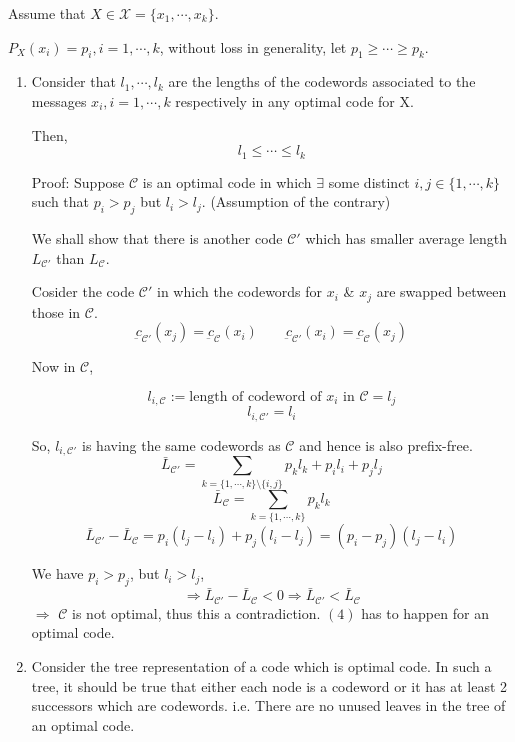 \documentclass{article}
\begin{document}
Assume that $X \in \mathcal{X}= \{ x_1, \cdots, x_k\}$.

$P_X(x_i)= p_i, i=1, \cdots , k$, without loss in generality, let $p_1 \geq \cdots \geq p_k$.
\begin{enumerate}
    \item Consider that $l_1, \cdots, l_k$ are the lengths of the codewords associated to the messages $x_i, i=1,\cdots, k$ respectively in any optimal code for X.

    Then,
    \begin{equation}
        l_1 \leq \cdots \leq l_k
    \end{equation}

    Proof: Suppose $\mathscr{C}$ is an optimal code in which $\exists $ some distinct $i,j \in \{1,\cdots, k \}$ such that $p_i > p_j$ but $l_i > l_j$. (Assumption of the contrary)

    We shall show that there is another code $\mathscr{C}'$ which has smaller average length $L_{\mathscr{C'}}$ than $L_{\mathscr{C}}$.

    Cosider the code $\mathscr{C}'$ in which the codewords for $x_i$ \& $x_j$ are swapped between those in $\mathscr{C}$.
    $$ \underbar{c}_{\mathscr{C'}}(x_j)=\underbar{c}_{\mathscr{C}}(x_i) \qquad \underbar{c}_{\mathscr{C'}}(x_i)=\underbar{c}_{\mathscr{C}}(x_j)$$

    Now in $\mathscr{C}$,

    $$l_{i, \mathscr{C}} :=  \text{length of codeword of } x_i \text{ in }\mathscr{C}= l_j$$
$$l_{i, \mathscr{C'}}= l_i$$

So, $l_{i, \mathscr{C'}}$ is having the same codewords as $\mathscr{C}$ and hence is also prefix-free.
$$ \bar{L}_\mathscr{C'}= \sum_{k= \{ 1, \cdots, k\} \setminus \{ i,j\}}  p_k l_k+ p_i l_i + p_j l_j$$
$$ \bar{L}_\mathscr{C}= \sum_{k= \{ 1, \cdots, k\}} p_k l_k$$
$$ \bar{L}_\mathscr{C'} - \bar{L}_\mathscr{C} = p_i(l_j -l_i)+ p_j(l_i -l_j) =(p_i-p_j)(l_j -l_i) $$

We have $p_i > p_j$, but $l_i > l_j$,
$$ \Rightarrow  \bar{L}_\mathscr{C'} - \bar{L}_\mathscr{C} < 0 \Rightarrow  \bar{L}_\mathscr{C'} < \bar{L}_\mathscr{C}$$
$\Rightarrow$ $\mathscr{C}$ is not optimal, thus this a contradiction. $(4)$ has to happen for an optimal code.

\item Consider the tree representation of a code which is optimal code. In such a tree, it should be true that either each node is a codeword or it has at least 2 successors which are codewords. i.e. There are no unused leaves in the tree of an optimal code.
\end{enumerate}
\end{document}
